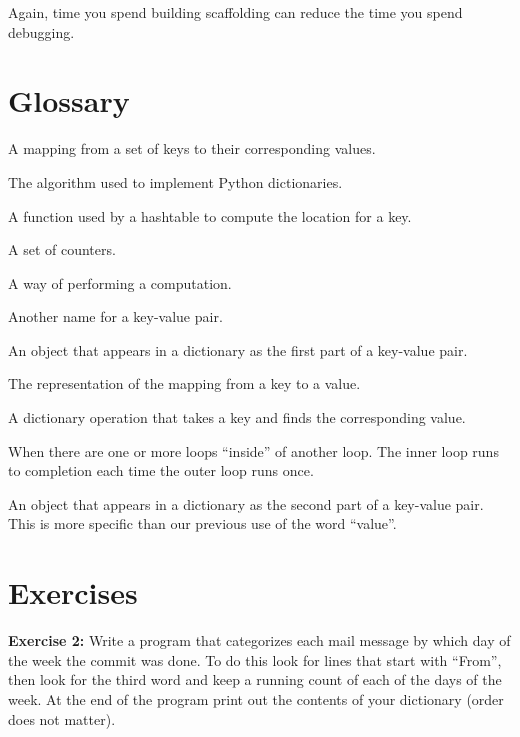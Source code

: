 \documentclass[10pt,]{book}
\providecommand{\tightlist}{%
  \setlength{\itemsep}{0pt}\setlength{\parskip}{0pt}}
\begin{document}
Again, time you spend building scaffolding can reduce the time you spend
debugging. 

\section{Glossary}\label{glossary-8}

\begin{description}
\tightlist
\item[dictionary]
A mapping from a set of keys to their corresponding values.
\item[hashtable]
The algorithm used to implement Python dictionaries. 
\item[hash function]
A function used by a hashtable to compute the location for a key.
\item[histogram]
A set of counters. 
\item[implementation]
A way of performing a computation. 
\item[item]
Another name for a key-value pair. 
\item[key]
An object that appears in a dictionary as the first part of a key-value
pair. 
\item[key-value pair]
The representation of the mapping from a key to a value.
\item[lookup]
A dictionary operation that takes a key and finds the corresponding
value. 
\item[nested loops]
When there are one or more loops ``inside'' of another loop. The inner
loop runs to completion each time the outer loop runs once.
 
\item[value]
An object that appears in a dictionary as the second part of a key-value
pair. This is more specific than our previous use of the word ``value''.
\end{description}

\section{Exercises}\label{exercises-8}

\textbf{Exercise 2:} Write a program that categorizes each mail message
by which day of the week the commit was done. To do this look for lines
that start with ``From'', then look for the third word and keep a
running count of each of the days of the week. At the end of the program
print out the contents of your dictionary (order does not matter).
\end{document}
